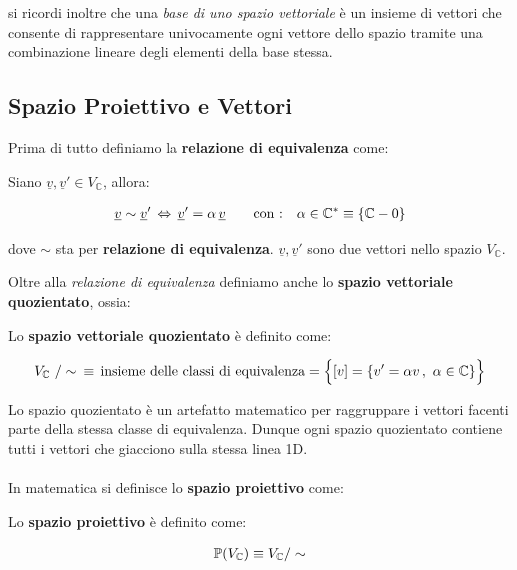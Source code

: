 	si ricordi inoltre che una \textit{base di uno spazio vettoriale} è un insieme di vettori che consente di rappresentare univocamente ogni vettore dello spazio tramite una combinazione lineare degli elementi della base stessa.

\subsection{Spazio Proiettivo e Vettori}

	Prima di tutto definiamo la \textbf{relazione di equivalenza} come:

\begin{mydef}
	Siano $\underline{v}, \underline{v}' \in V_{\mathbb{C}}$, allora:
	
\begin{align*}
	\underline{v} \sim \underline{v}' \, \Leftrightarrow  \, \underline{v}' = \alpha \, \underline{v}  \qquad \text{con :} \quad \alpha \in \mathbb{C}^{*} \equiv \qty{\mathbb{C} - 0}
\end{align*}

	dove $\sim$ sta per \textbf{relazione di equivalenza}. $\underline{v}, \underline{v}'$ sono due vettori nello spazio $V_{\mathbb{C}}$.
\end{mydef}

	Oltre alla \textit{relazione di equivalenza} definiamo anche lo \textbf{spazio vettoriale quozientato}, ossia:

\begin{mydef}

	Lo \textbf{spazio vettoriale quozientato} è definito come:
	
\begin{align*}
	V_{\mathbb{C}} \, \, / \sim \,\, \, \equiv \,  \text{insieme delle classi di equivalenza} = \qty\Big{ \qty[v] = \qty{v' = \alpha v \,, \,\,  \alpha \in \mathbb{C}}}
\end{align*}
\end{mydef}

	Lo spazio quozientato è un artefatto matematico per raggruppare i vettori facenti parte della stessa classe di equivalenza. Dunque ogni spazio quozientato contiene tutti i vettori che giacciono sulla stessa linea 1D.
	\\
	\\
	In matematica si definisce lo \textbf{spazio proiettivo} come:
	
\begin{mydef}
	Lo \textbf{spazio proiettivo} è definito come: 
	
	\begin{align*}
		\mathbb{P}\qty(V_{\mathbb{C}}) \equiv V_{\mathbb{C}} / \sim
	\end{align*}

\end{mydef}

